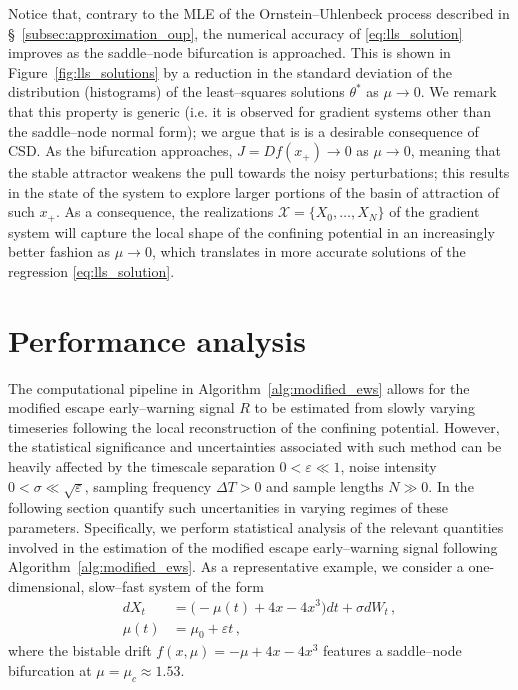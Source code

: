 Notice that, contrary to the MLE of the Ornstein--Uhlenbeck process described in \S~\ref{subsec:approximation_oup}, the numerical accuracy of \eqref{eq:lls_solution} improves as the saddle--node bifurcation is approached.
This is shown in Figure~\ref{fig:lls_solutions} by a reduction in the standard deviation of the distribution (histograms) of the least--squares solutions $\theta^*$ as $\mu\to0$.
We remark that this property is generic (i.e. it is observed for gradient systems other than the saddle--node normal form); we argue that is is a desirable consequence of CSD.
As the bifurcation approaches, $J=Df(x_+)\to0$ as $\mu\to0$, meaning that the stable attractor weakens the pull towards the noisy perturbations; this results in the state of the system to explore larger portions of the basin of attraction of such $x_+$.
As a consequence, the realizations $\mathcal{X} = \{X_0,\dots,X_N\}$ of the gradient system will capture the local shape of the confining potential in an increasingly better fashion as $\mu\to0$, which translates in more accurate solutions of the regression \eqref{eq:lls_solution}.

\section{Performance analysis}\label{sec:analysis}
The computational pipeline in Algorithm~\ref{alg:modified_ews} allows for the modified escape early--warning signal $R$ to be estimated from slowly varying timeseries following the local reconstruction of the confining potential.
However, the statistical significance and uncertainties associated with such method can be heavily affected by the timescale separation $0<\varepsilon\ll1$, noise intensity $0<\sigma\ll\sqrt{\varepsilon}$, sampling frequency $\Delta T>0$ and sample lengths $N\gg0$.
In the following section quantify such uncertanities in varying regimes of these parameters.
Specifically, we perform statistical analysis of the relevant quantities involved in the estimation of the modified escape early--warning signal following Algorithm~\ref{alg:modified_ews}.
As a representative example, we consider a one-dimensional, slow--fast system of the form
%
\begin{equation}
        \begin{aligned}\label{eq:bistable_model}
                dX_t &= \bigl(-\mu(t) + 4x - 4x^3\bigr)dt + \sigma dW_t\,,\\ 
                \mu(t) &= \mu_0 + \varepsilon t\,,
        \end{aligned}
\end{equation}
%
where the bistable drift $f(x,\mu)= -\mu + 4x - 4x^3$ features a saddle--node bifurcation at $\mu=\mu_c\approx1.53$.

